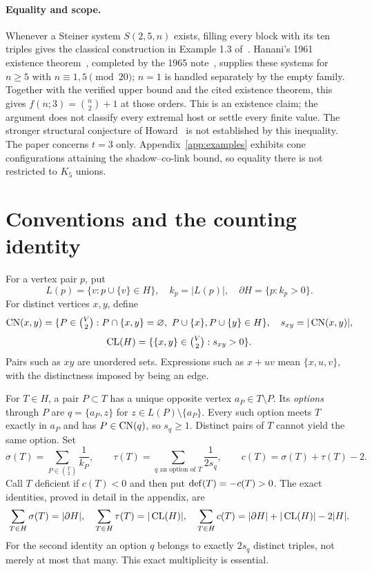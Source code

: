 \paragraph{Equality and scope.}
Whenever a Steiner system $S(2,5,n)$ exists, filling every block with its ten triples gives the classical construction in Example 1.3 of~\cite{furedi}. Hanani's 1961 existence theorem~\cite[(7.10), pp.~378--380]{hanani1961}, completed by the 1965 note~\cite[p.~711]{hanani1965}, supplies these systems for $n\ge5$ with $n\equiv1,5\pmod{20}$; $n=1$ is handled separately by the empty family. Together with the verified upper bound and the cited existence theorem, this gives $f(n;3)=\binom n2+1$ at those orders. This is an existence claim; the argument does not classify every extremal host or settle every finite value. The stronger structural conjecture of Howard~\cite[Conjecture~3.6]{howard} is not established by this inequality. The paper concerns $t=3$ only. Appendix~\ref{app:examples} exhibits cone configurations attaining the shadow--co-link bound, so equality there is not restricted to $K_5$ unions.

\section{Conventions and the counting identity}\label{sec:notation}
For a vertex pair $p$, put
\[
 L(p)=\{v:p\cup\{v\}\in H\},\quad k_p=|L(p)|,\quad
 \partial H=\{p:k_p>0\}.
\]
For distinct vertices $x,y$, define
\[
 \operatorname{CN}(x,y)=\{P\in\tbinom V2:P\cap\{x,y\}=\varnothing,
       \ P\cup\{x\},P\cup\{y\}\in H\},
\quad s_{xy}=|\operatorname{CN}(x,y)|,
\]
\[
 \operatorname{CL}(H)=\{\{x,y\}\in\tbinom V2:s_{xy}>0\}.
\]
Pairs such as $xy$ are unordered sets. Expressions such as $x+uv$ mean $\{x,u,v\}$, with the distinctness imposed by being an edge.

For $T\in H$, a pair $P\subset T$ has a unique opposite vertex $a_P\in T\setminus P$. Its \emph{options} through $P$ are $q=\{a_P,z\}$ for $z\in L(P)\setminus\{a_P\}$. Every such option meets $T$ exactly in $a_P$ and has $P\in\operatorname{CN}(q)$, so $s_q\geq1$. Distinct pairs of $T$ cannot yield the same option. Set
\[
 \sigma(T)=\sum_{P\in\binom T2}\frac1{k_P},\qquad
 \tau(T)=\sum_{q\text{ an option of }T}\frac1{2s_q},\qquad
 c(T)=\sigma(T)+\tau(T)-2.
\]
Call $T$ deficient if $c(T)<0$ and then put $\operatorname{def}(T)=-c(T)>0$. The exact identities, proved in detail in the appendix, are
\[
 \sum_{T\in H}\sigma(T)=|\partial H|,\quad
 \sum_{T\in H}\tau(T)=|\operatorname{CL}(H)|,\quad
 \sum_{T\in H}c(T)=|\partial H|+|\operatorname{CL}(H)|-2|H|.
\]
For the second identity an option $q$ belongs to exactly $2s_q$ distinct triples, not merely at most that many. This exact multiplicity is essential.

